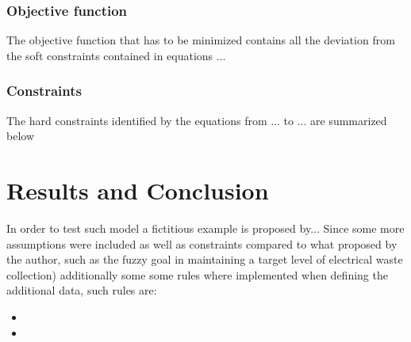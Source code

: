 \documentclass{article}
\begin{document}
\subsubsection{Objective function}
The objective function that has to be minimized contains all the deviation from the soft constraints contained in equations ... 
\subsubsection{Constraints}
The hard constraints identified by the equations from ... to ... are summarized below 

\pagebreak

\section{Results and Conclusion}
In order to test such model a fictitious example is proposed by... Since some more assumptions were included as well as constraints compared to what proposed by the author, such as the fuzzy goal in maintaining a target level of electrical waste collection) additionally some some rules where implemented when defining the additional data, such rules are:
\begin{itemize}
	\item
	\item
\end{itemize}


\newpage 

\printbibliography
\end{document}
